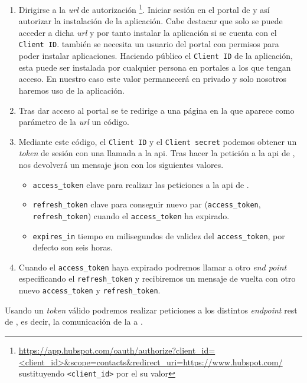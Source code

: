 \begin{enumerate}
	\item Dirigirse a la \textit{url} de autorización \footnote{\url{https://app.hubspot.com/oauth/authorize?client_id=<client_id>&scope=contacts&redirect_uri=https://www.hubspot.com/} sustituyendo \texttt{<client\_id>} por el su valor}.
	Iniciar sesión en el portal de \hs{} y así autorizar la instalación de la aplicación. Cabe destacar que solo se puede acceder a dicha \textit{url} y por tanto instalar la aplicación si se cuenta con el \texttt{Client ID}. también se necesita un usuario del portal con permisos para poder instalar aplicaciones.
	Haciendo público el \texttt{Client ID} de la aplicación, esta puede ser instalada por cualquier persona en portales a los que tengan acceso. En nuestro caso este valor permanecerá en privado y solo nosotros haremos uso de la aplicación.
		
	\item Tras dar acceso al portal se te redirige a una página en la que aparece como parámetro de la \textit{url} un código.
	\item Mediante este código, el \texttt{Client ID} y el \texttt{Client secret} podemos obtener un \textit{token} de sesión con una llamada a la \acrshort{api}.
	Tras hacer la petición a la \acrshort{api} de \hs{}, nos devolverá un mensaje \acrshort{json} con los siguientes valores.
		\begin{itemize}
			\item \texttt{access\_token} clave para realizar las peticiones a la \acrshort{api} de \hs{}.
			\item \texttt{refresh\_token} clave para conseguir nuevo par (\texttt{access\_token}, \texttt{refresh\_token}) cuando el \texttt{access\_token} ha expirado.
			\item \texttt{expires\_in} tiempo en milisegundos de validez del \texttt{access\_token}, por defecto son seis horas.
		\end{itemize}
	\item Cuando el \texttt{access\_token} haya expirado podremos llamar a otro \textit{end point} especificando el \texttt{refresh\_token} y recibiremos un mensaje de vuelta con otro nuevo \texttt{access\_token} y \texttt{refresh\_token}.
\end{enumerate}

Usando un \textit{token} válido podremos realizar peticiones a los distintos \textit{endpoint} \acrshort{rest} de \hs{}, es decir, la comunicación de la \iface{} a \hs{}.\\

